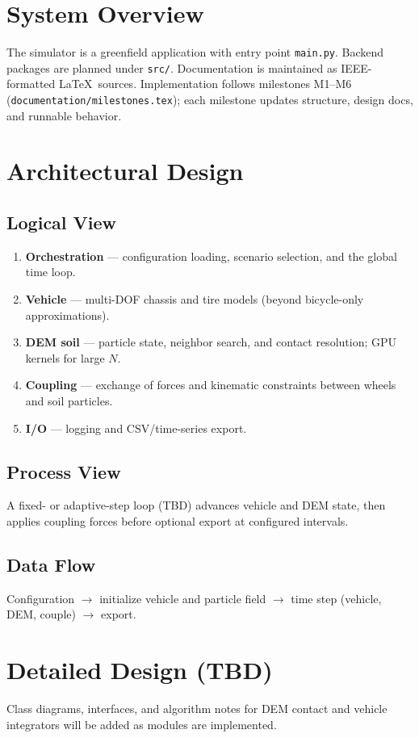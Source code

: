 \documentclass[conference]{ieeetran.cls}
\begin{document}
\section{System Overview}
The simulator is a greenfield application with entry point \texttt{main.py}.
Backend packages are planned under \texttt{src/}. Documentation is maintained as
IEEE-formatted \LaTeX\ sources. Implementation follows milestones M1--M6
(\texttt{documentation/milestones.tex}); each milestone updates structure,
design docs, and runnable behavior.

\section{Architectural Design}

\subsection{Logical View}
\begin{enumerate}
  \item \textbf{Orchestration} --- configuration loading, scenario selection,
        and the global time loop.
  \item \textbf{Vehicle} --- multi-DOF chassis and tire models (beyond
        bicycle-only approximations).
  \item \textbf{DEM soil} --- particle state, neighbor search, and contact
        resolution; GPU kernels for large $N$.
  \item \textbf{Coupling} --- exchange of forces and kinematic constraints
        between wheels and soil particles.
  \item \textbf{I/O} --- logging and CSV/time-series export.
\end{enumerate}

\subsection{Process View}
A fixed- or adaptive-step loop (TBD) advances vehicle and DEM state, then
applies coupling forces before optional export at configured intervals.

\subsection{Data Flow}
Configuration $\rightarrow$ initialize vehicle and particle field $\rightarrow$
time step (vehicle, DEM, couple) $\rightarrow$ export.

\section{Detailed Design (TBD)}
Class diagrams, interfaces, and algorithm notes for DEM contact and vehicle
integrators will be added as modules are implemented.
\end{document}
